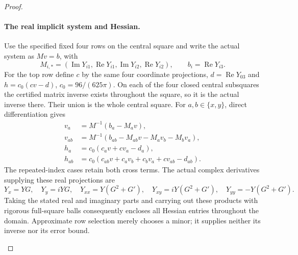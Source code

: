 \begin{proof}
\begin{enumerate}[label=\arabic*.]
\paragraph{The real implicit system and Hessian.}
Use the specified fixed four rows on the central square and
write the actual system as $Mv=b$, with
\[
 M_{i,*}=(\operatorname{Im}Y_{i1},\operatorname{Re}Y_{i1},
          \operatorname{Im}Y_{i2},\operatorname{Re}Y_{i2}),
 \qquad b_i=\operatorname{Re}Y_{i3}.
\]
For the top row define $c$ by the same four coordinate projections,
$d=\operatorname{Re}Y_{03}$ and $h=c_0(cv-d)$,
$c_0=96/(625\pi)$. On each of the four closed central subsquares the certified
matrix inverse exists throughout the square, so it is the actual
inverse there. Their union is the whole central square.
For $a,b\in\{x,y\}$, direct differentiation gives
\[
 \begin{split}
 v_a&=M^{-1}(b_a-M_av),\\
 v_{ab}&=M^{-1}(b_{ab}-M_{ab}v-M_av_b-M_bv_a),\\
 h_a&=c_0(c_av+cv_a-d_a),\\
 h_{ab}&=c_0(c_{ab}v+c_av_b+c_bv_a+cv_{ab}-d_{ab}).
 \end{split}
\]
The repeated-index cases retain both cross terms. The actual
complex derivatives supplying these real projections are
\[
 Y_x=YG,\quad Y_y=iYG,\quad
 Y_{xx}=Y(G^2+G'),\quad Y_{xy}=iY(G^2+G'),\quad
 Y_{yy}=-Y(G^2+G').
\]
Taking the stated real and imaginary parts and carrying out these
products with rigorous full-square balls consequently encloses
all Hessian entries throughout the domain. Approximate row
selection merely chooses a minor; it supplies neither its inverse
nor its error bound.


\end{enumerate}
\end{proof}
